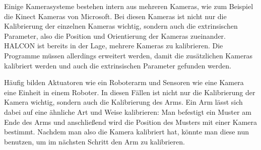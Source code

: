 Einige Kamerasysteme bestehen intern aus mehreren Kameras, wie zum Beispiel die Kinect Kameras von Microsoft. Bei diesen Kameras ist nicht nur die Kalibrierung der einzelnen Kameras wichtig, sondern auch die extrinsischen Parameter, also die Position und Orientierung der Kameras zueinander. HALCON ist bereits in der Lage, mehrere Kameras zu kalibrieren. Die Programme müssen allerdings erweitert werden, damit die zusätzlichen Kameras kalibriert werden und auch die extrinsischen Parameter gefunden werden.

Häufig bilden Aktuatoren wie ein Roboterarm und Sensoren wie eine Kamera eine Einheit in einem Roboter. In diesen Fällen ist nicht nur die Kalibrierung der Kamera wichtig, sondern auch die Kalibrierung des Arms. Ein Arm lässt sich dabei auf eine ähnliche Art und Weise kalibrieren: Man befestigt ein Muster am Ende des Arms und anschließend wird die Position des Musters mit einer Kamera bestimmt. Nachdem man also die Kamera kalibriert hat, könnte man diese nun benutzen, um im nächsten Schritt den Arm zu kalibrieren.